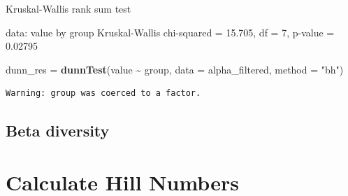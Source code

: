\documentclass[
]{book}
\newenvironment{Shaded}{\begin{snugshade}}{\end{snugshade}}
\newcommand{\AttributeTok}[1]{\textcolor[rgb]{0.13,0.29,0.53}{#1}}
\newcommand{\FunctionTok}[1]{\textcolor[rgb]{0.13,0.29,0.53}{\textbf{#1}}}
\newcommand{\NormalTok}[1]{#1}
\newcommand{\OtherTok}[1]{\textcolor[rgb]{0.56,0.35,0.01}{#1}}
\newcommand{\SpecialCharTok}[1]{\textcolor[rgb]{0.81,0.36,0.00}{\textbf{#1}}}
\newcommand{\StringTok}[1]{\textcolor[rgb]{0.31,0.60,0.02}{#1}}
\begin{document}
\begin{Shaded}
\begin{Highlighting}[]

\NormalTok{    Kruskal{-}Wallis rank sum test}

\NormalTok{data:  value by group}
\NormalTok{Kruskal{-}Wallis chi{-}squared = 15.705, df = 7, p{-}value = 0.02795}
\end{Highlighting}
\end{Shaded}

\begin{Shaded}
\begin{Highlighting}[]
\NormalTok{dunn\_res }\OtherTok{=} \FunctionTok{dunnTest}\NormalTok{(value }\SpecialCharTok{\textasciitilde{}}\NormalTok{ group, }\AttributeTok{data =}\NormalTok{ alpha\_filtered, }\AttributeTok{method =} \StringTok{"bh"}\NormalTok{)}
\end{Highlighting}
\end{Shaded}

\begin{verbatim}
Warning: group was coerced to a factor.
\end{verbatim}

\section{Beta diversity}\label{beta-diversity}

\chapter{Calculate Hill Numbers}\label{calculate-hill-numbers-1}
\end{document}
